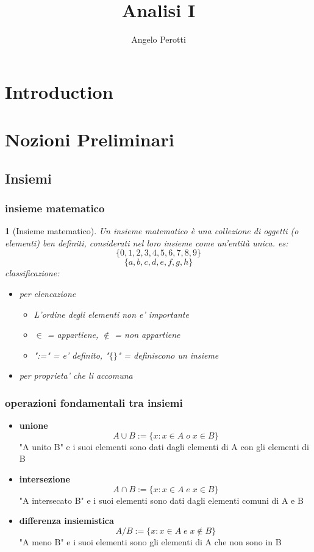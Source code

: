 \documentclass{article}
\title{Analisi I}
\author{Angelo Perotti}
\theoremstyle{mystyle}
\newtheorem*{mydefinition}{}
\begin{document}
\maketitle
\newpage
\tableofcontents
\newpage

\section{Introduction}

\section{Nozioni Preliminari}

\subsection{Insiemi}

\subsubsection{insieme matematico}
\begin{mydefinition}[Insieme matematico]
Un \emph{insieme matematico} è una collezione di oggetti
(o elementi) ben definiti, considerati nel loro insieme
come un’entità unica. \newline es:
\[
   \{0, 1, 2, 3, 4, 5, 6, 7, 8, 9\}
\]
\[
   \{a, b, c, d, e, f, g, h\}
\]
\newline
classificazione:
\begin{itemize}
    \item per \emph{elencazione}
        \begin{itemize}
            \item L'ordine degli elementi non e' importante
            \item $\in$ = appartiene, $\notin$ = non appartiene
            \item ":=" = e' definito, "$ \{ \} $" = definiscono un insieme
        \end{itemize}
    \item per \emph{proprieta' che li accomuna}
\end{itemize}
\end{mydefinition}
\newline
\subsubsection{operazioni fondamentali tra insiemi}
\begin{itemize}
    \item \textbf{unione} $$ A\cup B := \{ x:x \in A \; o \; x \in B \}$$
    "A unito B" e i suoi elementi sono dati dagli elementi di A con gli elementi di B
    \item \textbf{intersezione}$$ A\cap B := \{ x:x \in A \; e \; x \in B \}$$
    "A intersecato B" e i suoi elementi sono dati dagli elementi comuni di A e B
    \item \textbf{differenza insiemistica}$$ A/B := \{ x:x \in A \; e \; x \notin B \}$$
    "A meno B" e i suoi elementi sono gli elementi di A che non sono in B
\end{itemize}
\end{document}
